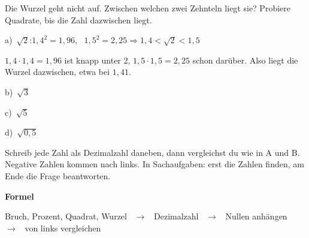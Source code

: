 \documentclass[11pt]{article}
\makeatletter
\providecommand{\grau}[1]{{\color{mbgrau}#1}}
\newcommand{\aufg}[3]{\par\noindent\makebox[0pt][r]{#3}\begin{minipage}[t]{\linewidth}#1\end{minipage}\par}
\newcommand{\nr}[1]{\makebox[7mm][l]{\textbf{#1}}}
\newlength{\kr}
\newcommand{\karomerk}[2]{\protected@write\@auxout{}{\string\karoseite{#1}{#2}{\thepage}}}
\newcommand{\karoseite}[3]{\expandafter\xdef\csname karo@#1@#2\endcsname{#3}}
\makeatother
\begin{document}
\aufg{\nr{3.}\begin{minipage}[t]{\dimexpr\linewidth-7mm\relax}Die Wurzel geht nicht auf. Zwischen welchen zwei Zehnteln liegt sie? Probiere Quadrate, bis die Zahl dazwischen liegt.\par\smallskip
\grau{a)\ $\sqrt{2}$:\quad $1{,}4^2 = 1{,}96$, \ $1{,}5^2 = 2{,}25$\quad$\Rightarrow$\quad $1{,}4 < \sqrt{2} < 1{,}5$}\par{\small $1{,}4 \cdot 1{,}4 = 1{,}96$ ist knapp unter 2, $1{,}5 \cdot 1{,}5 = 2{,}25$ schon darüber. Also liegt die Wurzel dazwischen, etwa bei $1{,}41$.}\par\medskip
\noindent\begin{minipage}[t]{0.48\linewidth}\raggedright
b)\ $\sqrt{3}$
\end{minipage}\hfill
\begin{minipage}[t]{0.48\linewidth}\raggedright
c)\ $\sqrt{5}$
\end{minipage}\par\smallskip
\noindent\begin{minipage}[t]{0.48\linewidth}\raggedright
d)\ $\sqrt{0{,}5}$
\end{minipage}\par\smallskip\end{minipage}}{}{{\scriptsize\color{mbgrau}Ziel\hspace{2mm}}}
\medskip
\par\vspace{3mm}\setlength{\kr}{\dimexpr\pagegoal-\pagetotal-10mm\relax}%
\ifdim\kr>12mm\karomerk{k}{D}\noindent{\scriptsize\color{mbgrau}Platz zum Rechnen}\par\nointerlineskip\vspace{1mm}\noindent
\begin{tikzpicture}\clip (0,0) rectangle ({\linewidth-0.5mm},\kr);\draw[black!16,line width=0.3pt,step=5mm] (0,0) grid (\linewidth,\kr);\end{tikzpicture}\fi\par
\clearpage\label{s:E}\noindent\colorbox{black!12}{}\hspace{3mm}{\Large\bfseries Alles gemischt: vergleichen und entscheiden}\par\smallskip
\noindent Schreib jede Zahl als Dezimalzahl daneben, dann vergleichst du wie in A und B. Negative Zahlen kommen nach links. In Sachaufgaben: erst die Zahlen finden, am Ende die Frage beantworten.\par\medskip
\noindent\textbf{Formel}\par\nopagebreak\noindent\hspace*{4mm}\begin{minipage}{\dimexpr\linewidth-4mm\relax}Bruch, Prozent, Quadrat, Wurzel \ $\to$ \ Dezimalzahl \ $\to$ \ Nullen anhängen \ $\to$ \ von links vergleichen\end{minipage}\par\medskip
\end{document}
